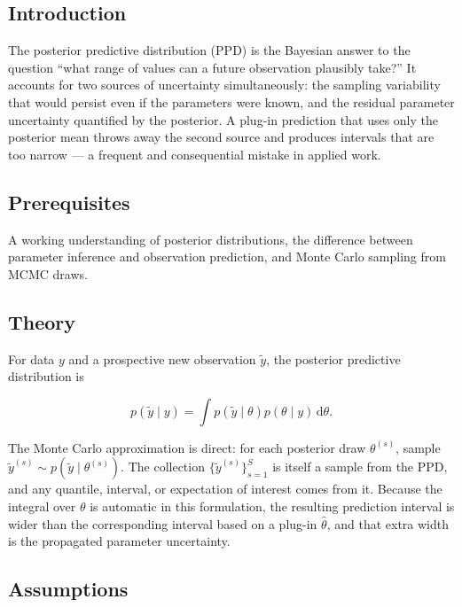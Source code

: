 \documentclass[
]{article}
\author{}
\date{\vspace{-2.5em}}
\begin{document}
\subsection{Introduction}\label{introduction}

The posterior predictive distribution (PPD) is the Bayesian answer to
the question ``what range of values can a future observation plausibly
take?'' It accounts for two sources of uncertainty simultaneously: the
sampling variability that would persist even if the parameters were
known, and the residual parameter uncertainty quantified by the
posterior. A plug-in prediction that uses only the posterior mean throws
away the second source and produces intervals that are too narrow --- a
frequent and consequential mistake in applied work.

\subsection{Prerequisites}\label{prerequisites}

A working understanding of posterior distributions, the difference
between parameter inference and observation prediction, and Monte Carlo
sampling from MCMC draws.

\subsection{Theory}\label{theory}

For data \(y\) and a prospective new observation \(\tilde y\), the
posterior predictive distribution is

\[p(\tilde y \mid y) = \int p(\tilde y \mid \theta) p(\theta \mid y) \, \mathrm d \theta.\]

The Monte Carlo approximation is direct: for each posterior draw
\(\theta^{(s)}\), sample
\(\tilde y^{(s)} \sim p(\tilde y \mid \theta^{(s)})\). The collection
\(\{\tilde y^{(s)}\}_{s=1}^S\) is itself a sample from the PPD, and any
quantile, interval, or expectation of interest comes from it. Because
the integral over \(\theta\) is automatic in this formulation, the
resulting prediction interval is wider than the corresponding interval
based on a plug-in \(\hat\theta\), and that extra width is the
propagated parameter uncertainty.

\subsection{Assumptions}\label{assumptions}
\end{document}
